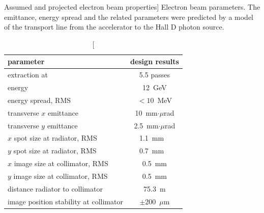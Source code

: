 \begin{table}[ht!]
\begin{center}
\caption
[Assumed and projected electron beam properties]
{Electron beam parameters. The emittance, energy spread and
the related parameters were
predicted by a model of the transport line from
the accelerator to the Hall D photon source. }
\label{tab:elecprop}
\begin{tabular}{|l|c|}
\hline\hline
parameter & design results \\
\hline
extraction at & 5.5 passes \\
energy & 12~GeV \\
energy spread, RMS & $<10$~MeV \\
transverse $x$ emittance & 10~mm$\cdot\mu$rad \\
transverse $y$ emittance & 2.5~mm$\cdot\mu$rad \\
$x$ spot size at radiator, RMS & 1.1~mm \ \\
$y$ spot size at radiator, RMS & 0.7~mm \ \\
$x$ image size at collimator, RMS & 0.5~mm \\
$y$ image size at collimator, RMS & 0.5~mm \\
distance radiator to collimator & 75.3~m \\
image position stability at collimator & $\pm$200~$\mu$m \\
\hline\hline
\end{tabular}
\end{center}
\end{table}


